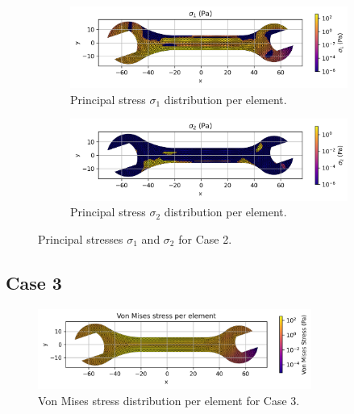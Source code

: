 \begin{figure}[H]
    \centering
    \begin{subfigure}[t]{0.49\textwidth}
      \centering
      \includegraphics[width=\textwidth]{GRAFICOS/Case a - sigma_1_per_element.png}
      \caption{Principal stress $\sigma_1$ distribution per element.}
      \label{fig:sigma_1_a}
    \end{subfigure}
    \hfill
    \begin{subfigure}[t]{0.49\textwidth}
      \centering
      \includegraphics[width=\textwidth]{GRAFICOS/Case a - sigma_2_per_element.png}
      \caption{Principal stress $\sigma_2$ distribution per element.}
      \label{fig:sigma_2_a}
    \end{subfigure}
    \caption{Principal stresses $\sigma_1$ and $\sigma_2$ for Case 2.}
    \label{fig:principal_stresses_a}
\end{figure}



\subsection{Case 3}

\begin{figure}[H]
    \centering
    \includegraphics[width=0.8\textwidth]{GRAFICOS/Case c_von_mises_per_element.png}
    \caption{Von Mises stress distribution per element for Case 3.}
    \label{fig:von_mises_c}
\end{figure}

